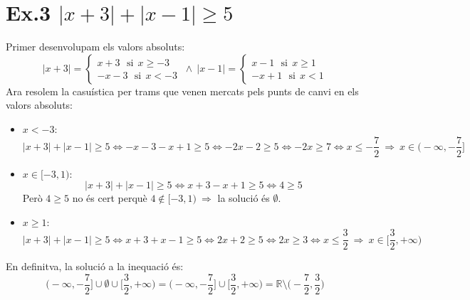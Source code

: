 \section*{Ex.3 $|x+3|+|x-1|\geq5$}
Primer desenvolupam els valors absoluts:
\begin{equation*}
|x+3|=\left\lbrace
\begin{array}{cc}
x+3 \ \ \ \text{si} \ \ x\geq-3
\\ -x-3 \ \ \ \text{si} \ \ x<-3
\end{array}\right.
\ \wedge \
|x-1|=\left\lbrace
\begin{array}{cc}
x-1 \ \ \ \text{si} \ \ x\geq1
\\ -x+1 \ \ \ \text{si} \ \ x<1
\end{array}\right.
\end{equation*}
Ara resolem la casuística per trams que venen mercats pels punts de canvi en els valors absoluts:
\begin{itemize}
\item $x<-3$:
\begin{equation*}
|x+3|+|x-1|\geq5 \Leftrightarrow -x-3-x+1\geq5 \Leftrightarrow -2x-2\geq5 \Leftrightarrow -2x\geq7 \Leftrightarrow x\leq-\frac{7}{2} \ \Longrightarrow \ x\in\Bigg(-\infty,-\frac{7}{2}\Bigg]
\end{equation*}
\item $x\in[-3,1)$:
\begin{equation*}
|x+3|+|x-1|\geq5 \Leftrightarrow x+3-x+1\geq5 \Leftrightarrow 4\geq5
\end{equation*}
Però $4\geq5$ no és cert perquè $4\notin[-3,1) \ \Longrightarrow$ la solució és $\emptyset$.
\item $x\geq1$:
\begin{equation*}
|x+3|+|x-1|\geq5 \Leftrightarrow x+3+x-1\geq5 \Leftrightarrow 2x+2\geq5 \Leftrightarrow 2x\geq3 \Leftrightarrow x\leq\frac{3}{2} \ \Longrightarrow \ x\in\Bigg[\frac{3}{2},+\infty\Bigg)
\end{equation*}
\end{itemize}
En definitva, la solució a la inequació és:
\begin{equation*}
\Bigg(-\infty,-\frac{7}{2}\Bigg]\cup\emptyset\cup\Bigg[\frac{3}{2},+\infty\Bigg) = \Bigg(-\infty,-\frac{7}{2}\Bigg]\cup\Bigg[\frac{3}{2},+\infty\Bigg)=\mathbb{R}\setminus\Big(-\frac{7}{2},\frac{3}{2}\Big)
\end{equation*}